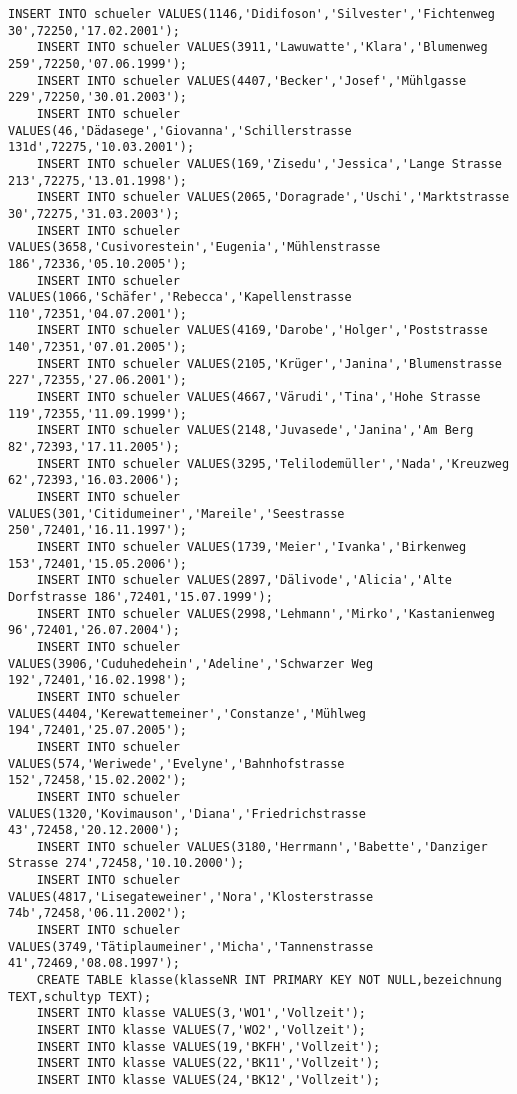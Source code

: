 \begin{lstlisting}[breaklines=True, numbers=none, basicstyle=\tiny, keepspaces=false]
	INSERT INTO schueler VALUES(1146,'Didifoson','Silvester','Fichtenweg 30',72250,'17.02.2001');
	INSERT INTO schueler VALUES(3911,'Lawuwatte','Klara','Blumenweg 259',72250,'07.06.1999');
	INSERT INTO schueler VALUES(4407,'Becker','Josef','Mühlgasse 229',72250,'30.01.2003');
	INSERT INTO schueler VALUES(46,'Dädasege','Giovanna','Schillerstrasse 131d',72275,'10.03.2001');
	INSERT INTO schueler VALUES(169,'Zisedu','Jessica','Lange Strasse 213',72275,'13.01.1998');
	INSERT INTO schueler VALUES(2065,'Doragrade','Uschi','Marktstrasse 30',72275,'31.03.2003');
	INSERT INTO schueler VALUES(3658,'Cusivorestein','Eugenia','Mühlenstrasse 186',72336,'05.10.2005');
	INSERT INTO schueler VALUES(1066,'Schäfer','Rebecca','Kapellenstrasse 110',72351,'04.07.2001');
	INSERT INTO schueler VALUES(4169,'Darobe','Holger','Poststrasse 140',72351,'07.01.2005');
	INSERT INTO schueler VALUES(2105,'Krüger','Janina','Blumenstrasse 227',72355,'27.06.2001');
	INSERT INTO schueler VALUES(4667,'Värudi','Tina','Hohe Strasse 119',72355,'11.09.1999');
	INSERT INTO schueler VALUES(2148,'Juvasede','Janina','Am Berg 82',72393,'17.11.2005');
	INSERT INTO schueler VALUES(3295,'Telilodemüller','Nada','Kreuzweg 62',72393,'16.03.2006');
	INSERT INTO schueler VALUES(301,'Citidumeiner','Mareile','Seestrasse 250',72401,'16.11.1997');
	INSERT INTO schueler VALUES(1739,'Meier','Ivanka','Birkenweg 153',72401,'15.05.2006');
	INSERT INTO schueler VALUES(2897,'Dälivode','Alicia','Alte Dorfstrasse 186',72401,'15.07.1999');
	INSERT INTO schueler VALUES(2998,'Lehmann','Mirko','Kastanienweg 96',72401,'26.07.2004');
	INSERT INTO schueler VALUES(3906,'Cuduhedehein','Adeline','Schwarzer Weg 192',72401,'16.02.1998');
	INSERT INTO schueler VALUES(4404,'Kerewattemeiner','Constanze','Mühlweg 194',72401,'25.07.2005');
	INSERT INTO schueler VALUES(574,'Weriwede','Evelyne','Bahnhofstrasse 152',72458,'15.02.2002');
	INSERT INTO schueler VALUES(1320,'Kovimauson','Diana','Friedrichstrasse 43',72458,'20.12.2000');
	INSERT INTO schueler VALUES(3180,'Herrmann','Babette','Danziger Strasse 274',72458,'10.10.2000');
	INSERT INTO schueler VALUES(4817,'Lisegateweiner','Nora','Klosterstrasse 74b',72458,'06.11.2002');
	INSERT INTO schueler VALUES(3749,'Tätiplaumeiner','Micha','Tannenstrasse 41',72469,'08.08.1997');
	CREATE TABLE klasse(klasseNR INT PRIMARY KEY NOT NULL,bezeichnung TEXT,schultyp TEXT);
	INSERT INTO klasse VALUES(3,'WO1','Vollzeit');
	INSERT INTO klasse VALUES(7,'WO2','Vollzeit');
	INSERT INTO klasse VALUES(19,'BKFH','Vollzeit');
	INSERT INTO klasse VALUES(22,'BK11','Vollzeit');
	INSERT INTO klasse VALUES(24,'BK12','Vollzeit');

\end{lstlisting}
